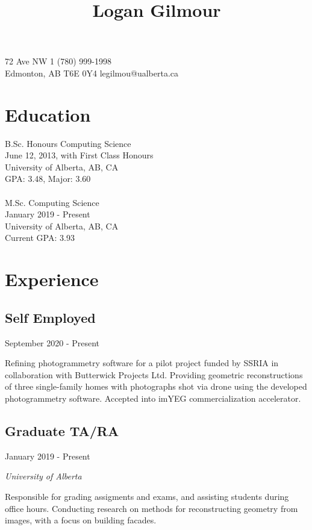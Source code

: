 \documentclass[10pt]{article}
\title{\bfseries\Large Logan Gilmour}
\author{}
\date{}
\begin{document}
\maketitle
{} 72 Ave NW \hfill 1 (780) 999-1998\\
Edmonton, AB  T6E 0Y4 \hfill legilmou@ualberta.ca
\section*{Education}

B.Sc. Honours Computing Science\\
June 12, 2013, with First Class Honours\\
University of Alberta, AB, CA\\
GPA: 3.48, Major: 3.60\\
\\
M.Sc. Computing Science\\
January 2019 - Present\\
University of Alberta, AB, CA\\
Current GPA: 3.93\\

\section*{Experience}

\subsection*{Self Employed}
September 2020 - Present

Refining photogrammetry software for a pilot project funded by SSRIA in collaboration with Butterwick Projects Ltd. Providing geometric reconstructions of three single-family homes with photographs shot via drone using the developed photogrammetry software. Accepted into imYEG commercialization accelerator.

\subsection*{Graduate TA/RA}
January 2019 - Present

\emph{University of Alberta}
\vspace{\baselineskip}

Responsible for grading assigments and exams, and assisting students during office hours. Conducting research on methods for reconstructing geometry from images, with a focus on building facades.
\end{document}
